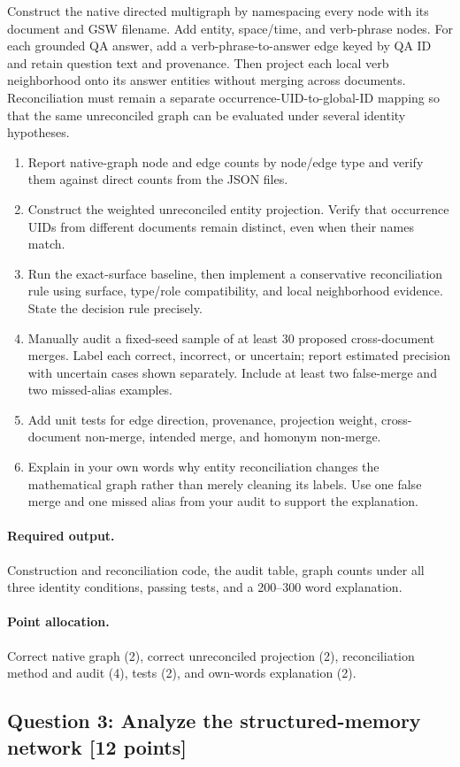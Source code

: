 \documentclass[11pt]{article}
\newcommand{\question}[3]{%
  \subsection[Question #1: #2 (#3 points)]{Question #1: #2 \hfill [#3 points]}%
}
\newcommand{\deliverables}{\paragraph{Required output.}}
\newcommand{\grading}{\paragraph{Point allocation.}}
\begin{document}
Construct the native directed multigraph by namespacing every node with its
document and GSW filename. Add entity, space/time, and verb-phrase nodes. For
each grounded QA answer, add a verb-phrase-to-answer edge keyed by QA ID and
retain question text and provenance. Then project each local verb neighborhood
onto its answer entities without merging across documents. Reconciliation
must remain a separate occurrence-UID-to-global-ID mapping so that the same
unreconciled graph can be evaluated under several identity hypotheses.

\begin{enumerate}[label=(\alph*)]
  \item Report native-graph node and edge counts by node/edge type and verify
        them against direct counts from the JSON files.
  \item Construct the weighted unreconciled entity projection. Verify that
        occurrence UIDs from different documents remain distinct, even when
        their names match.
  \item Run the exact-surface baseline, then implement a conservative
        reconciliation rule using surface, type/role compatibility, and local
        neighborhood evidence. State the decision rule precisely.
  \item Manually audit a fixed-seed sample of at least 30 proposed
        cross-document merges. Label each correct, incorrect, or uncertain;
        report estimated precision with uncertain cases shown separately.
        Include at least two false-merge and two missed-alias examples.
  \item Add unit tests for edge direction, provenance, projection weight,
        cross-document non-merge, intended merge, and homonym non-merge.
  \item Explain in your own words why entity reconciliation changes the
        mathematical graph rather than merely cleaning its labels. Use one
        false merge and one missed alias from your audit to support the
        explanation.
\end{enumerate}

\deliverables Construction and reconciliation code, the audit table, graph
counts under all three identity conditions, passing tests, and a 200--300 word
explanation.

\grading Correct native graph (2), correct unreconciled projection (2),
reconciliation method and audit (4), tests (2), and own-words explanation (2).

\question{3}{Analyze the structured-memory network}{12}
\end{document}
